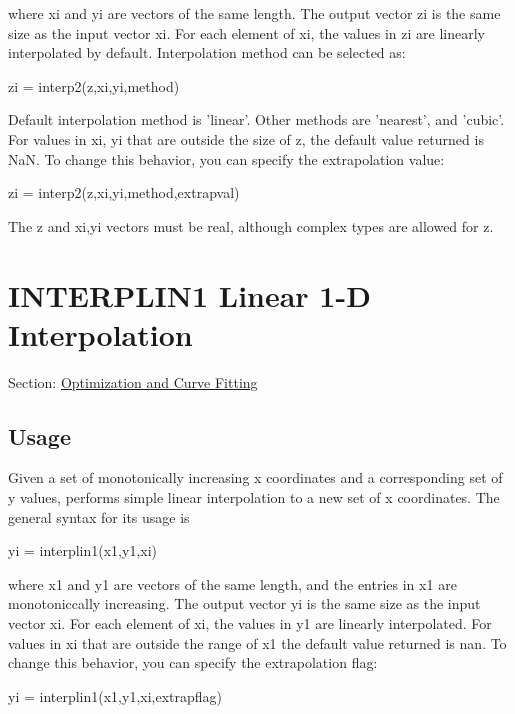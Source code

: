  where {\ttfamily xi} and {\ttfamily yi} are vectors of the same length. The output vector {\ttfamily zi} is the same size as the input vector {\ttfamily xi}. For each element of {\ttfamily xi}, the values in {\ttfamily zi} are linearly interpolated by default. Interpolation method can be selected as\-: \begin{DoxyVerb}   zi = interp2(z,xi,yi,method)
\end{DoxyVerb}
 Default interpolation method is {\ttfamily 'linear'}. Other methods are {\ttfamily 'nearest'}, and {\ttfamily 'cubic'}. For values in {\ttfamily xi, yi} that are outside the size of {\ttfamily z}, the default value returned is Na\-N. To change this behavior, you can specify the extrapolation value\-: \begin{DoxyVerb}   zi = interp2(z,xi,yi,method,extrapval)
\end{DoxyVerb}
 The {\ttfamily z} and {\ttfamily xi,yi} vectors must be real, although complex types are allowed for {\ttfamily z}. \hypertarget{curvefit_interplin1}{}\section{I\-N\-T\-E\-R\-P\-L\-I\-N1 Linear 1-\/\-D Interpolation}\label{curvefit_interplin1}
Section\-: \hyperlink{sec_curvefit}{Optimization and Curve Fitting} \hypertarget{vtkwidgets_vtkxyplotwidget_Usage}{}\subsection{Usage}\label{vtkwidgets_vtkxyplotwidget_Usage}
Given a set of monotonically increasing {\ttfamily x} coordinates and a corresponding set of {\ttfamily y} values, performs simple linear interpolation to a new set of {\ttfamily x} coordinates. The general syntax for its usage is \begin{DoxyVerb}   yi = interplin1(x1,y1,xi)
\end{DoxyVerb}
 where {\ttfamily x1} and {\ttfamily y1} are vectors of the same length, and the entries in {\ttfamily x1} are monotoniccally increasing. The output vector {\ttfamily yi} is the same size as the input vector {\ttfamily xi}. For each element of {\ttfamily xi}, the values in {\ttfamily y1} are linearly interpolated. For values in {\ttfamily xi} that are outside the range of {\ttfamily x1} the default value returned is {\ttfamily nan}. To change this behavior, you can specify the extrapolation flag\-: \begin{DoxyVerb}   yi = interplin1(x1,y1,xi,extrapflag)
\end{DoxyVerb}

